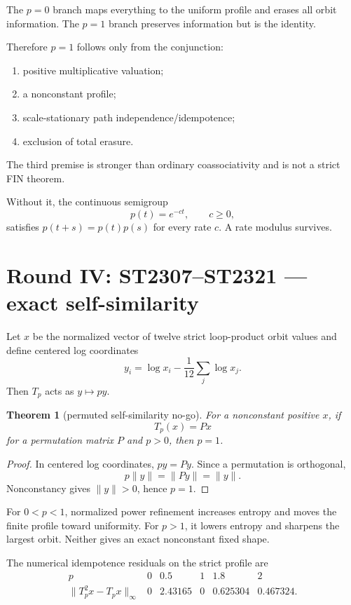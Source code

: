 \documentclass[11pt,a4paper]{article}
\newtheorem{theorem}{Theorem}\newtheorem{proposition}{Proposition}
\begin{document}
The \(p=0\) branch maps everything to the uniform profile and erases all orbit
information.  The \(p=1\) branch preserves information but is the identity.

Therefore \(p=1\) follows only from the conjunction:
\begin{enumerate}
\item positive multiplicative valuation;
\item a nonconstant profile;
\item scale-stationary path independence/idempotence;
\item exclusion of total erasure.
\end{enumerate}
The third premise is stronger than ordinary coassociativity and is not a
strict FIN theorem.

Without it, the continuous semigroup
\[
 p(t)=e^{-ct},\qquad c\geq0,
\]
satisfies \(p(t+s)=p(t)p(s)\) for every rate \(c\).  A rate modulus survives.

\section{Round IV: ST2307--ST2321 --- exact self-similarity}

Let \(x\) be the normalized vector of twelve strict loop-product orbit values
and define centered log coordinates
\[
 y_i=\log x_i-\frac1{12}\sum_j\log x_j.
\]
Then \(T_p\) acts as \(y\mapsto py\).

\begin{theorem}[permuted self-similarity no-go]
For a nonconstant positive \(x\), if
\[
 T_p(x)=Px
\]
for a permutation matrix \(P\) and \(p>0\), then \(p=1\).
\end{theorem}
\begin{proof}
In centered log coordinates, \(py=Py\).  Since a permutation is orthogonal,
\[
 p\|y\|=\|Py\|=\|y\|.
\]
Nonconstancy gives \(\|y\|>0\), hence \(p=1\).
\end{proof}

For \(0<p<1\), normalized power refinement increases entropy and moves the
finite profile toward uniformity.  For \(p>1\), it lowers entropy and sharpens
the largest orbit.  Neither gives an exact nonconstant fixed shape.

The numerical idempotence residuals on the strict profile are
\[
\begin{array}{c|ccccc}
p&0&0.5&1&1.8&2\\ \hline
\|T_p^2x-T_px\|_\infty&0&2.43165&0&0.625304&0.467324.
\end{array}
\]
\end{document}
